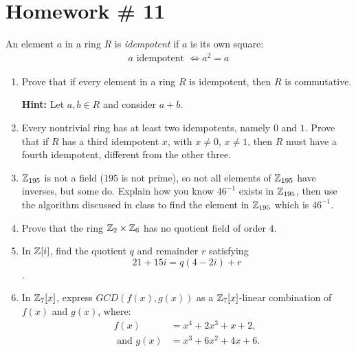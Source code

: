 \newpage 

\section{Homework \# 11}
\label{sec:HW11}
\vspace{0.1in}
\begin{definition}[Idempotent]
    An element $a$ in a ring $R$ is \textit{idempotent} if $a$ is its own square:
    \begin{align*}
        a \text{ idempotent } \iff a^2=a
    \end{align*}
\end{definition}
\begin{enumerate}
    \setlength{\itemsep}{10pt} %
    \item Prove that if every element in a ring $R$ is idempotent, then $R$ is commutative. 
    
    \textbf{Hint:} Let $a, b \in R$ and consider $a + b$.

    \item Every nontrivial ring has at least two idempotents, namely $0$ and $1$. Prove that if $R$ has a third idempotent $x$, with $x \neq 0$, $x \neq 1$, then $R$ must have a fourth idempotent, different from the other three.

    \item ${\mathbb{ Z}}_{195}$ is not a field ($195$ is not prime), so not all elements of ${\mathbb{ Z}}_{195}$ have inverses, but some do. Explain how you know $46^{-1}$ exists in ${\mathbb{ Z}}_{195}$, then use the algorithm discussed in class to find the element in ${\mathbb{ Z}}_{195}$ which is $46^{-1}$.

    \item Prove that the ring ${\mathbb{ Z}}_2 \times {\mathbb{ Z}}_6$ has no quotient field of order $4$.

    \item In ${\mathbb{ Z}}[i]$, find the quotient $q$ and remainder $r$ satisfying
    \[
    21 + 15i = q(4 - 2i) + r
    \]
    .

    \item In ${\mathbb{ Z}}_7[x]$, express $GCD(f(x), g(x))$ as a ${\mathbb{ Z}}_7[x]$-linear combination of $f(x)$ and $g(x)$, where:
    \begin{align*}
        f(x) &= x^4 + 2x^3 + x + 2,\\
        \text{ and  } g(x) &= x^3 + 6x^2 + 4x + 6.
    \end{align*}
\end{enumerate}
\newpage 

